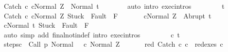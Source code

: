 \begin{isabellebody}
\ {\isachardoublequoteopen}{\isasymGamma}{\isasymturnstile}{\isasymlangle}Catch\ c\ cNormal\ Z{\isasymrangle}\ {\isasymRightarrow}\ Normal\ t{\isachardoublequoteclose}\isanewline
\ \ \ \ \ \ \isamarkupfalse%
\ {\isacharparenleft}auto\ intro{\isacharcolon}\ exec{\isachardot}intros{\isacharparenright}\isanewline
\ \ \isamarkupfalse%
\isanewline
\ \ \ \ \isamarkupfalse%
\ t\isanewline
\ \ \ \ \isamarkupfalse%
\ {\isachardoublequoteopen}{\isasymGamma}{\isasymturnstile}{\isasymlangle}Catch\ c\ cNormal\ Z{\isasymrangle}\ {\isasymRightarrow}{\isasymnotin}{\isacharparenleft}{\isacharbraceleft}Stuck{\isacharbraceright}\ {\isasymunion}\ Fault\ {\isacharbackquote}\ {\isacharparenleft}{\isacharminus}F{\isacharparenright}{\isacharparenright}{\isachardoublequoteclose}\ \isanewline
\ \ \ \ \ \ {\isachardoublequoteopen}{\isasymGamma}{\isasymturnstile}{\isasymlangle}cNormal\ Z{\isasymrangle}\ {\isasymRightarrow}\ Abrupt\ t{\isachardoublequoteclose}\isanewline
\ \ \ \ \isamarkupfalse%
\ {\isachardoublequoteopen}{\isasymGamma}{\isasymturnstile}{\isasymlangle}cNormal\ t{\isasymrangle}\ {\isasymRightarrow}{\isasymnotin}{\isacharparenleft}{\isacharbraceleft}Stuck{\isacharbraceright}\ {\isasymunion}\ Fault\ {\isacharbackquote}\ {\isacharparenleft}{\isacharminus}F{\isacharparenright}{\isacharparenright}{\isachardoublequoteclose}\isanewline
\ \ \ \ \ \ \isamarkupfalse%
\ {\isacharparenleft}auto\ simp\ add{\isacharcolon}\ final{\isacharunderscore}notin{\isacharunderscore}def\ intro{\isacharcolon}\ exec{\isachardot}intros{\isacharparenright}\isanewline
\ \ \isamarkupfalse%
\isanewline
\ \ \ \ \isamarkupfalse%
\ c{\isacharprime}\ t\isanewline
\ \ \ \ \isamarkupfalse%
\ steps{\isacharunderscore}c{\isacharprime}{\isacharcolon}\ {\isachardoublequoteopen}{\isasymGamma}{\isasymturnstile}\ {\isacharparenleft}Call\ p{\isacharcomma}\ Normal\ {\isasymsigma}{\isacharparenright}\ {\isasymrightarrow}\isactrlsup {\isacharplus}\ {\isacharparenleft}c{\isacharprime}{\isacharcomma}\ Normal\ Z{\isacharparenright}{\isachardoublequoteclose}\ \isanewline
\ \ \ \ \isamarkupfalse%
\ red{\isacharcolon}\ {\isachardoublequoteopen}Catch\ c\ c\ {\isasymin}\ redexes\ c{\isacharprime}{\isachardoublequoteclose}\isanewline

\end{isabellebody}
